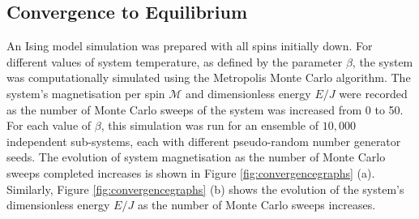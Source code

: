\documentclass[11pt]{iopart}
\begin{document}
\subsection{Convergence to Equilibrium}

An Ising model simulation was prepared with all spins initially down. For different values of system temperature, as defined by the parameter $\beta$, the system was computationally simulated using the Metropolis Monte Carlo algorithm. The system's magnetisation per spin $\mathcal{M}$ and dimensionless energy $E/J$ were recorded as the number of Monte Carlo sweeps of the system was increased from 0 to 50. For each value of $\beta$, this simulation was run for an ensemble of $10,000$ independent sub-systems, each with different pseudo-random number generator seeds. The evolution of system magnetisation as the number of Monte Carlo sweeps completed increases is shown in Figure \ref{fig:convergencegraphs} (a). Similarly, Figure \ref{fig:convergencegraphs} (b) shows the evolution of the system's dimensionless energy $E/J$ as the number of Monte Carlo sweeps increases.
\end{document}
